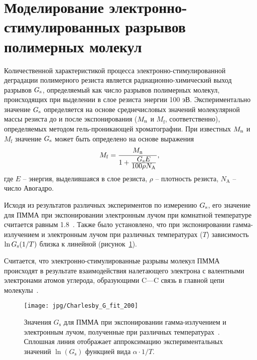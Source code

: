 \section{Моделирование электронно-стимулированных разрывов полимерных молекул} \label{sec:G_value}
Количественной характеристикой процесса электронно-стимулированной деградации полимерного резиста является радиационно-химический выход разрывов $G_\mathrm{s}$, определяемый как число разрывов полимерных молекул, происходящих при выделении в слое резиста энергии 100 эВ. Экспериментально значение $G_\mathrm{s}$ определяется на основе среднечисловых значений молекулярной массы резиста до и после экспонирования ($M_\mathrm{n}$ и $M_\mathrm{f}$, соответственно), определяемых методом гель-проникающей хроматографии. При известных $M_\mathrm{n}$ и $M_\mathrm{f}$ значение $G_\mathrm{s}$ может быть определено на основе выражения~\cite{Greeneich1979_Mf_Mn}
\begin{equation} \label{eq:G_value_Mn_Mf}
	M_\mathrm{f} = \frac{\displaystyle M_\mathrm{n}}{1 + \frac{\displaystyle G_\mathrm{s} E}{\displaystyle 100 \rho N_\mathrm{A}}},
\end{equation}
где $E$ -- энергия, выделившаяся в слое резиста, $\rho$ -- плотность резиста, $N_\mathrm{A}$ -- число Авогадро.

Исходя из результатов различных экспериментов по измерению $G_\mathrm{s}$, его значение для ПММА при экспонировании электронным лучом при комнатной температуре считается равным 1.8~\cite{Charlesby_1964_Gs}. Также было установлено, что при экспонировании гамма-излучением и электронным лучом при различных температурах ($T$) зависимость $\ln G_\mathrm{s} (1/T)$ близка к линейной (рисунок~\ref{fig:Gs_Charlesby}).

Считается, что электронно-стимулированные разрывы молекул ПММА происходят в результате взаимодействия налетающего электрона с валентными электронами атомов углерода, образующими C---C связь в главной цепи молекулы~\cite{Stepanova_2006}.

\begin{figure}[h]
	\begin{center}
		\texttt{[image: jpg/Charlesby\_G\_fit\_200]}
		\caption{Значения $G_\mathrm{s}$ для ПММА при экспонировании гамма-излучением и электронным лучом, полученные при различных температурах~\cite{Charlesby_1964_Gs}. Сплошная линия отображает аппроксимацию экспериментальных значений $\ln(G_\mathrm{s})$ функцией вида $\alpha\cdot1/T$.}
		\label{fig:Gs_Charlesby}
	\end{center}
\end{figure}
